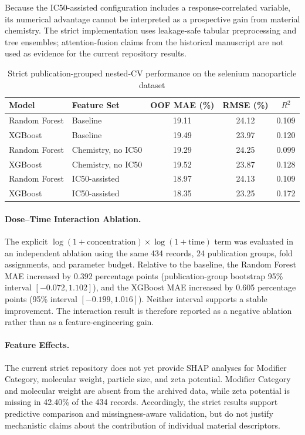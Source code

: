 Because the IC50-assisted configuration includes a response-correlated variable, its numerical advantage cannot be interpreted as a prospective gain from material chemistry. The strict implementation uses leakage-safe tabular preprocessing and tree ensembles; attention-fusion claims from the historical manuscript are not used as evidence for the current repository results.

\begin{table}[htbp]
  \centering
  \caption{Strict publication-grouped nested-CV performance on the selenium nanoparticle dataset}
  \label{tab:senp_main_results}
  \begin{tabular}{llccc}
    \hline
    Model & Feature Set & OOF MAE (\%) & RMSE (\%) & $R^2$ \\
    \hline
    Random Forest & Baseline & 19.11 & 24.12 & 0.109 \\
    XGBoost & Baseline & 19.49 & 23.97 & 0.120 \\
    Random Forest & Chemistry, no IC50 & 19.29 & 24.25 & 0.099 \\
    XGBoost & Chemistry, no IC50 & 19.52 & 23.87 & 0.128 \\
    Random Forest & IC50-assisted & 18.97 & 24.13 & 0.109 \\
    XGBoost & IC50-assisted & 18.35 & 23.25 & 0.172 \\
    \hline
  \end{tabular}
\end{table}

\paragraph{Dose--Time Interaction Ablation.}
The explicit $\log(1+\mathrm{concentration})\times\log(1+\mathrm{time})$ term was evaluated in an independent ablation using the same 434 records, 24 publication groups, fold assignments, and parameter budget. Relative to the baseline, the Random Forest MAE increased by 0.392 percentage points (publication-group bootstrap 95\% interval $[-0.072,1.102]$), and the XGBoost MAE increased by 0.605 percentage points (95\% interval $[-0.199,1.016]$). Neither interval supports a stable improvement. The interaction result is therefore reported as a negative ablation rather than as a feature-engineering gain.

\paragraph{Feature Effects.}
The current strict repository does not yet provide SHAP analyses for Modifier Category, molecular weight, particle size, and zeta potential. Modifier Category and molecular weight are absent from the archived data, while zeta potential is missing in 42.40\% of the 434 records. Accordingly, the strict results support predictive comparison and missingness-aware validation, but do not justify mechanistic claims about the contribution of individual material descriptors.

